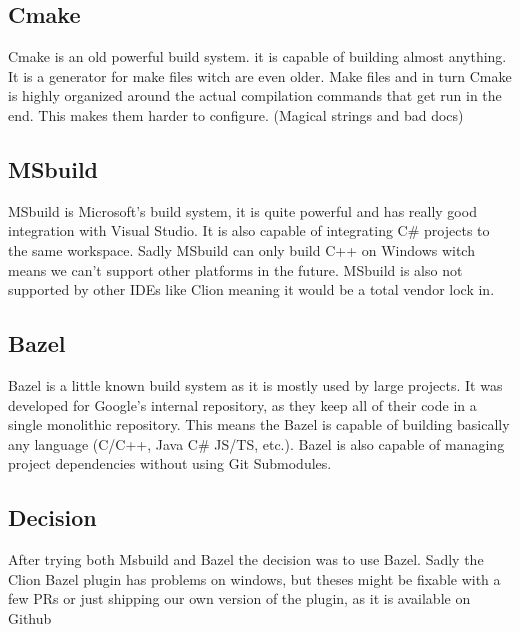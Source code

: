 \subsection{Cmake}
Cmake is an old powerful build system. it is capable of building almost anything. It is a generator for make files witch are even older. 
Make files and in turn Cmake is highly organized around the actual compilation commands that get run in the end.
This makes them harder to configure.
(Magical strings and bad docs)

\subsection{MSbuild}
MSbuild is Microsoft's build system, it is quite powerful and has really good integration with Visual Studio. 
It is also capable of integrating C# projects to the same workspace. 
Sadly MSbuild can only build C++ on Windows witch means we can't support other platforms in the future.
MSbuild is also not supported by other IDEs like Clion meaning it would be a total vendor lock in.

\subsection{Bazel}
Bazel is a little known build system as it is mostly used by large projects.
It was developed for Google's internal repository, as they keep all of their code in a single monolithic repository.
This means the Bazel is capable of building basically any language (C/C++, Java C# JS/TS, etc.).
Bazel is also capable of managing project dependencies without using Git Submodules.

\subsection{Decision}
After trying both Msbuild and Bazel the decision was to use Bazel.
Sadly the Clion Bazel plugin has problems on windows,
but theses might be fixable with a few PRs or just shipping our own version of the plugin, as it is available on Github